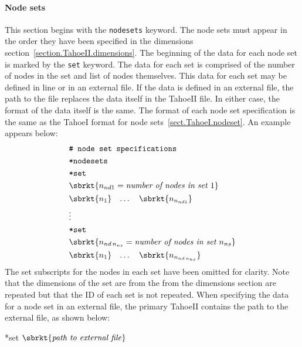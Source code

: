 \paragraph{Node sets}
This section begins with the \texttt{nodesets} keyword.
The node sets must appear in the order they have been specified in 
the dimensions section~\ref{section.TahoeII.dimensions}. The 
beginning of the data for each node set is marked by the \texttt{set} 
keyword. The data for each set is comprised of the number of nodes in 
the set and list of nodes themselves. This data for each set may be 
defined in line or in an external file. If the data is defined in an 
external file, the path to the file replaces the data itself in the 
TahoeII file. In either case, the format of the data itself is the 
same. The format of each node set specification is the same as the TahoeI 
format for node sets~\ref{sect.TahoeI.nodeset}. An example appears 
below:
\begin{align}
& \texttt{\# node set specifications} \notag \\
& \texttt{*nodesets} \notag \\
& \texttt{*set} \notag \\
& \sbrkt{n_{nd1} = \textit{number of nodes in set~}1} \notag \\
& \begin{matrix}
\sbrkt{n_{1}} & \dots  & \sbrkt{n_{n_{nd1}}} \\
\end{matrix} \notag \\
& \vdots \notag \\
& \texttt{*set} \notag \\
& \sbrkt{n_{nd\,n_{ns}} = \textit{number of nodes in set~}n_{ns}} \notag \\
& \begin{matrix}
\sbrkt{n_{1}} & \dots  & \sbrkt{n_{n_{nd\,n_{ns}}}} \\
\end{matrix} \notag
\end{align}
The set subscripts for the nodes in each set have been omitted for 
clarity.
Note that the dimensions of the set are from the from the dimensions 
section are repeated but that the ID of each set is not repeated.
When specifying the data for a node set in an external file, the 
primary TahoeII contains the path to the external file, as shown below:
\begin{inputfile}
*set \(\sbrkt{\textrm{\textit{path to external file}}}\)
\end{inputfile}

